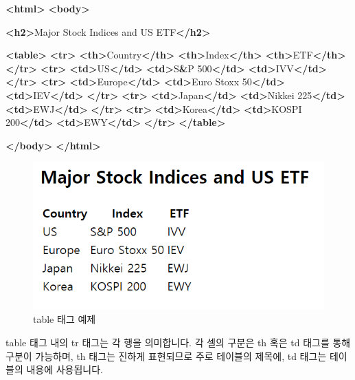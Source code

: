 \documentclass[]{book}
\newenvironment{Shaded}{\begin{snugshade}}{\end{snugshade}}
\newcommand{\ErrorTok}[1]{\textcolor[rgb]{0.64,0.00,0.00}{\textbf{#1}}}
\newcommand{\KeywordTok}[1]{\textcolor[rgb]{0.13,0.29,0.53}{\textbf{#1}}}
\newcommand{\NormalTok}[1]{#1}
\begin{document}
\begin{Shaded}
\begin{Highlighting}[]
\KeywordTok{<html>}
\KeywordTok{<body>}

\KeywordTok{<h2>}\NormalTok{Major Stock Indices and US ETF}\KeywordTok{</h2>}

\KeywordTok{<table>}
  \KeywordTok{<tr>}
    \KeywordTok{<th>}\NormalTok{Country}\KeywordTok{</th>}
    \KeywordTok{<th>}\NormalTok{Index}\KeywordTok{</th>}
    \KeywordTok{<th>}\NormalTok{ETF}\KeywordTok{</th>}
  \KeywordTok{</tr>}
  \KeywordTok{<tr>}
    \KeywordTok{<td>}\NormalTok{US}\KeywordTok{</td>}
    \KeywordTok{<td>}\NormalTok{S}\ErrorTok{&}\NormalTok{P 500}\KeywordTok{</td>}
    \KeywordTok{<td>}\NormalTok{IVV}\KeywordTok{</td>}
  \KeywordTok{</tr>}
  \KeywordTok{<tr>}
    \KeywordTok{<td>}\NormalTok{Europe}\KeywordTok{</td>}
    \KeywordTok{<td>}\NormalTok{Euro Stoxx 50}\KeywordTok{</td>}
    \KeywordTok{<td>}\NormalTok{IEV}\KeywordTok{</td>}
  \KeywordTok{</tr>}
  \KeywordTok{<tr>}
    \KeywordTok{<td>}\NormalTok{Japan}\KeywordTok{</td>}
    \KeywordTok{<td>}\NormalTok{Nikkei 225}\KeywordTok{</td>}
    \KeywordTok{<td>}\NormalTok{EWJ}\KeywordTok{</td>}
  \KeywordTok{</tr>}
  \KeywordTok{<tr>}
    \KeywordTok{<td>}\NormalTok{Korea}\KeywordTok{</td>}
    \KeywordTok{<td>}\NormalTok{KOSPI 200}\KeywordTok{</td>}
    \KeywordTok{<td>}\NormalTok{EWY}\KeywordTok{</td>}
  \KeywordTok{</tr>}
\KeywordTok{</table>}

\KeywordTok{</body>}
\KeywordTok{</html>}
\end{Highlighting}
\end{Shaded}

\begin{figure}

{\centering \includegraphics[width=0.5\linewidth]{images/html_5} 

}

\caption{table 태그 예제}\label{fig:unnamed-chunk-16}
\end{figure}

table 태그 내의 tr 태그는 각 행을 의미합니다. 각 셀의 구분은 th 혹은 td 태그를 통해 구분이 가능하며, th 태그는 진하게 표현되므로 주로 테이블의 제목에, td 태그는 테이블의 내용에 사용됩니다.
\end{document}
